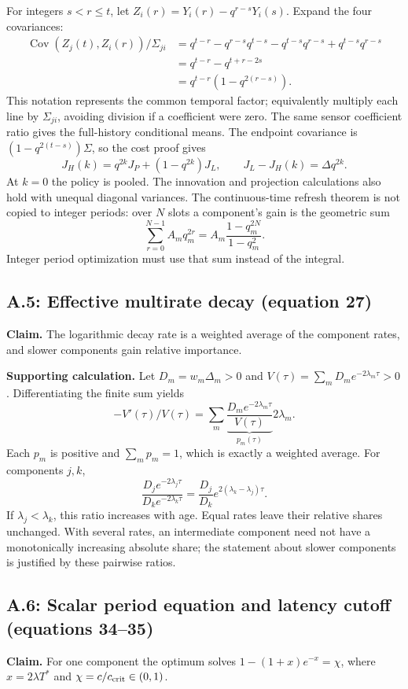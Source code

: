 \documentclass[12pt,letterpaper]{article}
\newcommand{\Cov}{\operatorname{Cov}}
\begin{document}
For integers $s<r\le t$, let $Z_i(r)=Y_i(r)-q^{r-s}Y_i(s)$. Expand the four covariances:
\begin{align*}
\Cov(Z_j(t),Z_i(r))/\Sigma_{ji}
&=q^{t-r}-q^{r-s}q^{t-s}-q^{t-s}q^{r-s}+q^{t-s}q^{r-s}\\
&=q^{t-r}-q^{t+r-2s}\\
&=q^{t-r}(1-q^{2(r-s)}).
\end{align*}
This notation represents the common temporal factor; equivalently multiply each line by $\Sigma_{ji}$, avoiding division if a coefficient were zero. The same sensor coefficient ratio gives the full-history conditional means. The endpoint covariance is $(1-q^{2(t-s)})\Sigma$, so the cost proof gives
\[
J_H(k)=q^{2k}J_P+(1-q^{2k})J_L,\qquad J_L-J_H(k)=\Delta q^{2k}.
\]
At $k=0$ the policy is pooled. The innovation and projection calculations also hold with unequal diagonal variances. The continuous-time refresh theorem is not copied to integer periods: over $N$ slots a component's gain is the geometric sum
\[
\sum_{r=0}^{N-1}A_mq_m^{2r}=A_m\frac{1-q_m^{2N}}{1-q_m^2}.
\]
Integer period optimization must use that sum instead of the integral.

\subsection{A.5: Effective multirate decay (equation 27)}
\textbf{Claim.} The logarithmic decay rate is a weighted average of the component rates, and slower components gain relative importance.

\textbf{Supporting calculation.} Let $D_m=w_m\Delta_m>0$ and $V(\tau)=\sum_mD_me^{-2\lambda_m\tau}>0$. Differentiating the finite sum yields
\[
-V'(\tau)/V(\tau)
=\sum_m\underbrace{\frac{D_me^{-2\lambda_m\tau}}{V(\tau)}}_{p_m(\tau)}2\lambda_m.
\]
Each $p_m$ is positive and $\sum_mp_m=1$, which is exactly a weighted average. For components $j,k$,
\[
\frac{D_je^{-2\lambda_j\tau}}{D_ke^{-2\lambda_k\tau}}
=\frac{D_j}{D_k}e^{2(\lambda_k-\lambda_j)\tau}.
\]
If $\lambda_j<\lambda_k$, this ratio increases with age. Equal rates leave their relative shares unchanged. With several rates, an intermediate component need not have a monotonically increasing absolute share; the statement about slower components is justified by these pairwise ratios.

\subsection{A.6: Scalar period equation and latency cutoff (equations 34--35)}
\textbf{Claim.} For one component the optimum solves $1-(1+x)e^{-x}=\chi$, where $x=2\lambda T^*$ and $\chi=c/c_{\rm crit}\in(0,1)$.
\end{document}
